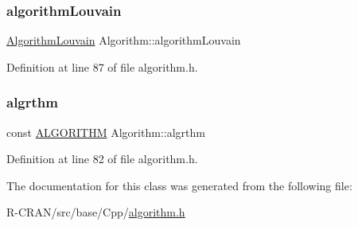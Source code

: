 \subsubsection{\texorpdfstring{algorithm\+Louvain}{algorithmLouvain}}
{\footnotesize\ttfamily \hyperlink{classAlgorithmLouvain}{Algorithm\+Louvain} Algorithm\+::algorithm\+Louvain\hspace{0.3cm}{\ttfamily [private]}}



Definition at line 87 of file algorithm.\+h.

\mbox{\label{classAlgorithm_aaee2fd7b239cc8721ec894716271dcd9}} 
\subsubsection{\texorpdfstring{algrthm}{algrthm}}
{\footnotesize\ttfamily const \hyperlink{classAlgorithm_a38e19a8c3dc51b97563a34d9e59a748d}{A\+L\+G\+O\+R\+I\+T\+HM} Algorithm\+::algrthm\hspace{0.3cm}{\ttfamily [private]}}



Definition at line 82 of file algorithm.\+h.



The documentation for this class was generated from the following file\+:\begin{DoxyCompactItemize}
\item 
R-\/\+C\+R\+A\+N/src/base/\+Cpp/\hyperlink{algorithm_8h}{algorithm.\+h}\end{DoxyCompactItemize}
